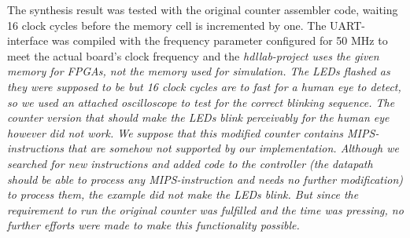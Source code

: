 The synthesis result was tested with the original counter assembler code, waiting 16 clock cycles before the memory cell is incremented by one. The UART-interface was compiled with the frequency parameter configured for 50 MHz to meet the actual board's clock frequency and the \em hdllab\em -project uses the given memory for FPGAs, not the memory used for simulation. The LEDs flashed as they were supposed to be but 16 clock cycles are to fast for a human eye to detect, so we used an attached oscilloscope to test for the correct blinking sequence. The counter version that should make the LEDs blink perceivably for the human eye however did not work. We suppose that this modified counter contains MIPS-instructions that are somehow not supported by our implementation. Although we searched for new instructions and added code to the controller (the datapath should be able to process any MIPS-instruction and needs no further modification) to process them, the example did not make the LEDs blink. But since the requirement to run the original counter was fulfilled and the time was pressing, no further efforts were made to make this functionality possible.